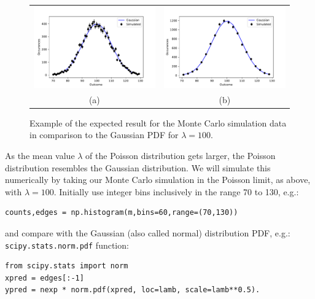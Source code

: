 \begin{figure}[htbp]
\begin{center}
\begin{tabular}{cc}
\includegraphics[height=0.22\textheight]{figs/labs/distributions/gauss_finebins.pdf} &
\includegraphics[height=0.22\textheight]{figs/labs/distributions/gauss.pdf} \\
(a) & (b) \\
\end{tabular}
\end{center}
\caption{\label{fig:gauss} Example of the expected result for the Monte Carlo simulation data in comparison to the Gaussian PDF for $\lambda=100$. }
\end{figure}

As the mean value $\lambda$ of the Poisson distribution gets larger,
the Poisson distribution resembles the Gaussian distribution.  We will
simulate this numerically by taking our Monte Carlo simulation in the
Poisson limit, as above, with $\lambda = 100$.  Initially use
integer bins inclusively in the range 70 to 130, e.g.:
\begin{verbatim}
counts,edges = np.histogram(m,bins=60,range=(70,130))
\end{verbatim}
and compare with the Gaussian (also called normal) distribution PDF, e.g.:
{\tt scipy.stats.norm.pdf} function:
\begin{verbatim}
from scipy.stats import norm
xpred = edges[:-1]
ypred = nexp * norm.pdf(xpred, loc=lamb, scale=lamb**0.5). 
\end{verbatim}

